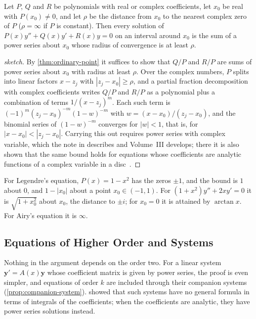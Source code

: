 \begin{theorem}
\label{thm:rational-coefficients}
Let $P$, $Q$ and $R$ be polynomials with real or complex coefficients, let $x_0$ be real with $P(x_0)\ne0$, and let $\rho$ be the distance from $x_0$ to the nearest complex zero of $P$ ($\rho=\infty$ if $P$ is constant). Then every solution of $P(x)y''+Q(x)y'+R(x)y=0$ on an interval around $x_0$ is the sum of a power series about $x_0$ whose radius of convergence is at least $\rho$.
\end{theorem}

\begin{proof}[sketch]
By \cref{thm:ordinary-point} it suffices to show that $Q/P$ and $R/P$ are sums of power series about $x_0$ with radius at least $\rho$. Over the complex numbers, $P$ splits into linear factors $x-z_j$ with $|z_j-x_0|\ge\rho$, and a partial fraction decomposition with complex coefficients writes $Q/P$ and $R/P$ as a polynomial plus a combination of terms $1/(x-z_j)^m$. Each such term is $(-1)^m(z_j-x_0)^{-m}(1-w)^{-m}$ with $w=(x-x_0)/(z_j-x_0)$, and the binomial series of $(1-w)^{-m}$ converges for $|w|<1$, that is, for $|x-x_0|<|z_j-x_0|$. Carrying this out requires power series with complex variable, which the note in  describes and Volume~III develops; there it is also shown that the same bound holds for equations whose coefficients are analytic functions of a complex variable in a disc~\cite{hille1976}.
\end{proof}

For Legendre's equation, $P(x)=1-x^2$ has the zeros $\pm1$, and the bound is $1$ about $0$, and $1-|x_0|$ about a point $x_0\in(-1,1)$. For $(1+x^2)y''+2xy'=0$ it is $\sqrt{1+x_0^2}$ about $x_0$, the distance to $\pm i$; for $x_0=0$ it is attained by $\arctan x$. For Airy's equation it is $\infty$.

\subsection{Equations of Higher Order and Systems}

Nothing in the argument depends on the order two. For a linear system $\mathbf y'=A(x)\mathbf y$ whose coefficient matrix is given by power series, the proof is even simpler, and equations of order $k$ are included through their companion systems (\cref{prop:companion-system}).  showed that such systems have no general formula in terms of integrals of the coefficients; when the coefficients are analytic, they have power series solutions instead.

